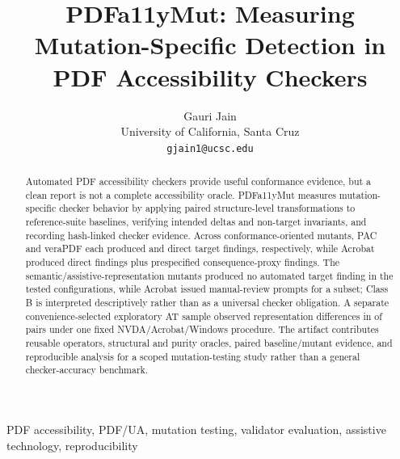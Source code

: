 \documentclass[conference]{IEEEtran}
\newenvironment{taggedparagraph}{%
  \tagstructbegin{tag=P}\tagmcbegin{tag=P}%
}{%
  \tagmcend\tagstructend%
}
\begin{document}

\title{PDFa11yMut: Measuring Mutation-Specific Detection in PDF Accessibility Checkers}
\author{Gauri Jain\\
University of California, Santa Cruz\\
\texttt{gjain1@ucsc.edu}}
\maketitle\tagmcend\tagstructend

\begin{taggedparagraph}\begin{abstract}
Automated PDF accessibility checkers provide useful conformance evidence, but a clean report is not a complete accessibility oracle. PDFa11yMut measures mutation-specific checker behavior by applying paired structure-level transformations to reference-suite baselines, verifying intended deltas and non-target invariants, and recording hash-linked checker evidence. Across \ClassAMutants{} conformance-oriented mutants, PAC and veraPDF each produced \ClassAPACDirect{} and \ClassAVeraDirect{} direct target findings, respectively, while Acrobat produced \ClassAAcrobatDirect{} direct findings plus \ClassAAcrobatProxy{} prespecified consequence-proxy findings. The \ClassBMutants{} semantic/assistive-representation mutants produced no automated target finding in the tested configurations, while Acrobat issued manual-review prompts for a subset; Class B is interpreted descriptively rather than as a universal checker obligation. A separate convenience-selected exploratory AT sample observed representation differences in \ATDifferenceCases{} of \ATCases{} pairs under one fixed NVDA/Acrobat/Windows procedure. The artifact contributes reusable operators, structural and purity oracles, paired baseline/mutant evidence, and reproducible analysis for a scoped mutation-testing study rather than a general checker-accuracy benchmark.
\end{abstract}\end{taggedparagraph}

\begin{taggedparagraph}\begin{IEEEkeywords}
PDF accessibility, PDF/UA, mutation testing, validator evaluation, assistive technology, reproducibility
\end{IEEEkeywords}\end{taggedparagraph}
\end{document}
